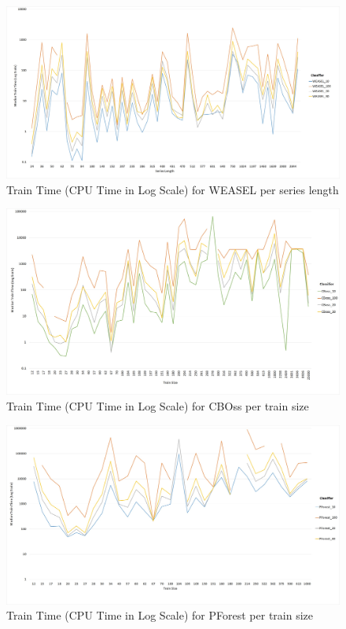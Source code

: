   \begin{figure} [!htb]
    \centering
    \includegraphics[width=\textwidth]{./Chapters/06 Results/Duration_weasel_length.jpg}
    \caption{Train Time (CPU Time in Log Scale) for WEASEL per series length}
  \end{figure}
  \begin{figure} [!htb]
    \centering
    \includegraphics[width=\textwidth]{./Chapters/06 Results/Duration_cboss_train_size.jpg}
    \caption{Train Time (CPU Time in Log Scale) for CBOss per train size}
  \end{figure}
  
  \begin{figure} [!htb]
    \centering
    \includegraphics[width=\textwidth]{./Chapters/06 Results/Duration_pforest_train_size.jpg}
    \caption{Train Time (CPU Time in Log Scale) for PForest per train size}
  \end{figure}
  
